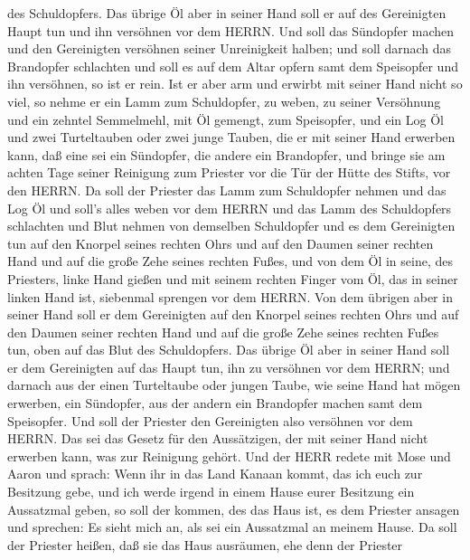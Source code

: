 des Schuldopfers.  Das übrige Öl aber in seiner Hand soll
er auf des Gereinigten Haupt tun und ihn versöhnen vor dem HERRN.
 Und soll das Sündopfer machen und den Gereinigten
versöhnen seiner Unreinigkeit halben; und soll darnach das Brandopfer
schlachten  und soll es auf dem Altar opfern samt dem
Speisopfer und ihn versöhnen, so ist er rein.  Ist er aber
arm und erwirbt mit seiner Hand nicht so viel, so nehme er ein Lamm zum
Schuldopfer, zu weben, zu seiner Versöhnung und ein zehntel Semmelmehl,
mit Öl gemengt, zum Speisopfer, und ein Log Öl  und zwei
Turteltauben oder zwei junge Tauben, die er mit seiner Hand erwerben
kann, daß eine sei ein Sündopfer, die andere ein Brandopfer,
 und bringe sie am achten Tage seiner Reinigung zum
Priester vor die Tür der Hütte des Stifts, vor den HERRN. 
Da soll der Priester das Lamm zum Schuldopfer nehmen und das Log Öl und
soll's alles weben vor dem HERRN  und das Lamm des
Schuldopfers schlachten und Blut nehmen von demselben Schuldopfer und es
dem Gereinigten tun auf den Knorpel seines rechten Ohrs und auf den
Daumen seiner rechten Hand und auf die große Zehe seines rechten Fußes,
 und von dem Öl in seine, des Priesters, linke Hand gießen
 und mit seinem rechten Finger vom Öl, das in seiner linken
Hand ist, siebenmal sprengen vor dem HERRN.  Von dem
übrigen aber in seiner Hand soll er dem Gereinigten auf den Knorpel
seines rechten Ohrs und auf den Daumen seiner rechten Hand und auf die
große Zehe seines rechten Fußes tun, oben auf das Blut des Schuldopfers.
 Das übrige Öl aber in seiner Hand soll er dem Gereinigten
auf das Haupt tun, ihn zu versöhnen vor dem HERRN;  und
darnach aus der einen Turteltaube oder jungen Taube, wie seine Hand hat
mögen erwerben,  ein Sündopfer, aus der andern ein
Brandopfer machen samt dem Speisopfer. Und soll der Priester den
Gereinigten also versöhnen vor dem HERRN.  Das sei das
Gesetz für den Aussätzigen, der mit seiner Hand nicht erwerben kann, was
zur Reinigung gehört.  Und der HERR redete mit Mose und
Aaron und sprach:  Wenn ihr in das Land Kanaan kommt, das
ich euch zur Besitzung gebe, und ich werde irgend in einem Hause eurer
Besitzung ein Aussatzmal geben,  so soll der kommen, des
das Haus ist, es dem Priester ansagen und sprechen: Es sieht mich an,
als sei ein Aussatzmal an meinem Hause.  Da soll der
Priester heißen, daß sie das Haus ausräumen, ehe denn der Priester
